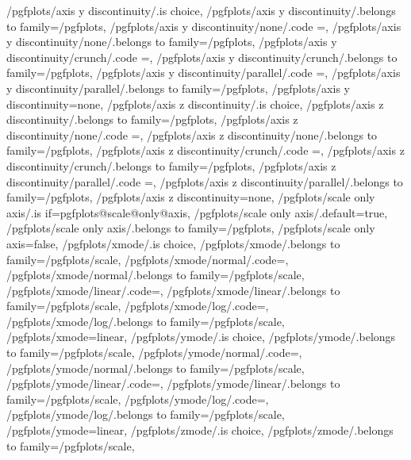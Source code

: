 {%
	/pgfplots/axis y discontinuity/.is choice,
	/pgfplots/axis y discontinuity/.belongs to family=/pgfplots, %
	/pgfplots/axis y discontinuity/none/.code	={\def\pgfplots@yaxisdiscontnum{0}},
	/pgfplots/axis y discontinuity/none/.belongs to family=/pgfplots, %
	/pgfplots/axis y discontinuity/crunch/.code	={\def\pgfplots@yaxisdiscontnum{1}},
	/pgfplots/axis y discontinuity/crunch/.belongs to family=/pgfplots, %
	/pgfplots/axis y discontinuity/parallel/.code	={\def\pgfplots@yaxisdiscontnum{2}},
	/pgfplots/axis y discontinuity/parallel/.belongs to family=/pgfplots, %
	/pgfplots/axis y discontinuity=none,
	/pgfplots/axis z discontinuity/.is choice,
	/pgfplots/axis z discontinuity/.belongs to family=/pgfplots, %
	/pgfplots/axis z discontinuity/none/.code	={\def\pgfplots@zaxisdiscontnum{0}},
	/pgfplots/axis z discontinuity/none/.belongs to family=/pgfplots, %
	/pgfplots/axis z discontinuity/crunch/.code	={\def\pgfplots@zaxisdiscontnum{1}},
	/pgfplots/axis z discontinuity/crunch/.belongs to family=/pgfplots, %
	/pgfplots/axis z discontinuity/parallel/.code	={\def\pgfplots@zaxisdiscontnum{2}},
	/pgfplots/axis z discontinuity/parallel/.belongs to family=/pgfplots, %
	/pgfplots/axis z discontinuity=none,
	/pgfplots/scale only axis/.is if=pgfplots@scale@only@axis,
	/pgfplots/scale only axis/.default=true,
	/pgfplots/scale only axis/.belongs to family=/pgfplots,
	/pgfplots/scale only axis=false,
	/pgfplots/xmode/.is choice,
	/pgfplots/xmode/.belongs to family=/pgfplots/scale,
	/pgfplots/xmode/normal/.code={\pgfplots@xislineartrue},
	/pgfplots/xmode/normal/.belongs to family=/pgfplots/scale,
	/pgfplots/xmode/linear/.code={\pgfplots@xislineartrue},
	/pgfplots/xmode/linear/.belongs to family=/pgfplots/scale,
	/pgfplots/xmode/log/.code={\pgfplots@xislinearfalse},
	/pgfplots/xmode/log/.belongs to family=/pgfplots/scale,
	/pgfplots/xmode=linear,
	/pgfplots/ymode/.is choice,
	/pgfplots/ymode/.belongs to family=/pgfplots/scale,
	/pgfplots/ymode/normal/.code={\pgfplots@yislineartrue},
	/pgfplots/ymode/normal/.belongs to family=/pgfplots/scale,
	/pgfplots/ymode/linear/.code={\pgfplots@yislineartrue},
	/pgfplots/ymode/linear/.belongs to family=/pgfplots/scale,
	/pgfplots/ymode/log/.code={\pgfplots@yislinearfalse},
	/pgfplots/ymode/log/.belongs to family=/pgfplots/scale,
	/pgfplots/ymode=linear,
	/pgfplots/zmode/.is choice,
	/pgfplots/zmode/.belongs to family=/pgfplots/scale,
}
